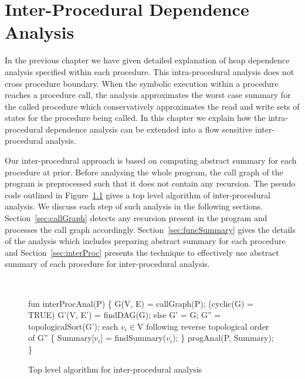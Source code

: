 \chapter{Inter-Procedural Dependence Analysis}
\label{ch:interdep}
In the previous chapter we have given detailed explanation of 
heap dependence analysis specified within each procedure. 
This intra-procedural analysis does not cross procedure boundary. 
When the symbolic execution within a procedure reaches a procedure call, 
the analysis approximates the worst case summary for the called 
procedure which conservatively approximates the read and write sets of states 
for the procedure being called. In this chapter we explain how the intra-procedural dependence 
analysis can be extended into a flow sensitive inter-procedural 
analysis. 

Our inter-procedural approach is based on computing 
abstract summary for each procedure at prior. Before analysing the whole program, 
the call graph of the program is preprocessed such that it does 
not contain any recursion. 
The pseudo code outlined in Figure~\ref{fig:interProc} 
gives a top level algorithm of inter-procedural analysis. We 
discuss each step of such analysis in the following 
sections. Section~\ref{sec:callGraph} detects any recursion present 
in the program and processes the call graph accordingly. 
Section~\ref{sec:funcSummary} gives the details of the 
analysis which includes preparing abstract 
summary for each procedure and Section~\ref{sec:interProc} presents 
the technique to effectively use abstract summary of each procedure 
for inter-procedural analysis. 
%
\begin{figure}
\begin{framed}
{\tt
  \begin{program}{0}
  \FL fun interProcAnal(P)  \{
   G(V, E) = callGraph(P); 
   \IF (cyclic(G) = TRUE) 
   G'(V, E') = findDAG(G); 
   else
   G' = G;
   G'' = topologicalSort(G'); 
   \FOR each $v_i\in$V following reverse topological order of G'' \{
   Summary[$v_i$] = findSummary($v_i$);  
   
   \} 
   progAnal(P, Summary); 
   
   \}
  \end{program}
}
\end{framed}
  \caption{Top level algorithm for inter-procedural analysis\label{fig:interProc}}
\end{figure}
%
